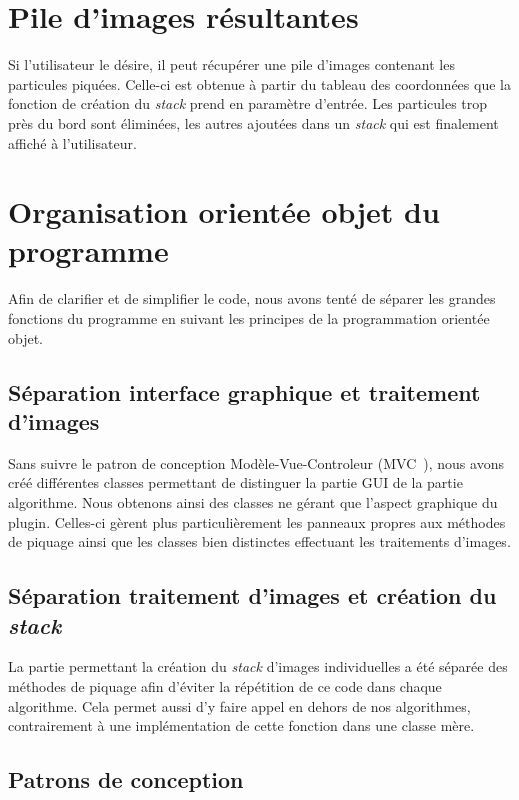 \section{Pile d'images résultantes}

Si l'utilisateur le désire, il peut récupérer une pile d'images contenant les particules piquées. Celle-ci est obtenue à partir du tableau des coordonnées que la fonction de création du \textit{stack} prend en paramètre d'entrée.
Les particules trop près du bord sont éliminées, les autres ajoutées dans un \textit{stack} qui est finalement affiché à l'utilisateur.

\section{Organisation orientée objet du programme}

Afin de clarifier et de simplifier le code, nous avons tenté de séparer les grandes fonctions du programme en suivant les principes de la programmation orientée objet.

\subsection{Séparation interface graphique et traitement d'images}

Sans suivre le patron de conception Modèle-Vue-Controleur (MVC~\cite{mvc:url}), nous avons créé différentes classes permettant de distinguer la partie GUI de la partie algorithme. Nous obtenons ainsi des classes ne gérant que l'aspect graphique du plugin. Celles-ci gèrent plus particulièrement les panneaux propres aux méthodes de piquage ainsi que les classes bien distinctes effectuant les traitements d'images.

\subsection{Séparation traitement d'images et création du \textit{stack}}

La partie permettant la création du \textit{stack} d'images individuelles a été séparée des méthodes de piquage afin d'éviter la répétition de ce code dans chaque algorithme. Cela permet aussi d'y faire appel en dehors de nos algorithmes, contrairement à une implémentation de cette fonction dans une classe mère.

\subsection{Patrons de conception}

